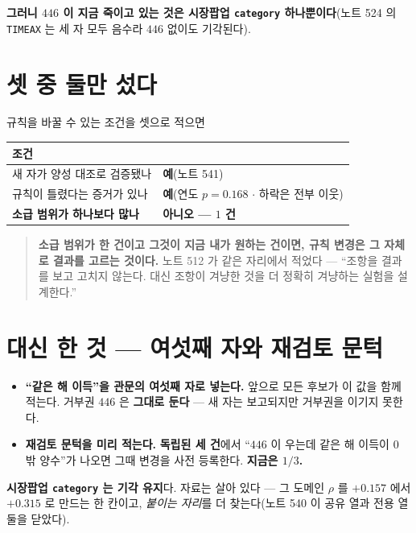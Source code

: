 \documentclass[11pt]{article}
\begin{document}
\textbf{그러니 $446$ 이 지금 죽이고 있는 것은 시장팝업 \texttt{category}
하나뿐이다}(노트 524 의 \texttt{TIMEAX} 는 세 자 모두 음수라 $446$ 없이도
기각된다).

\section{셋 중 둘만 섰다}

규칙을 바꿀 수 있는 조건을 셋으로 적으면

\begin{center}
\begin{tabular}{ll}
\hline
조건 & \\
\hline
새 자가 양성 대조로 검증됐나 & \textbf{예}(노트 541) \\
규칙이 틀렸다는 증거가 있나 & \textbf{예}(연도 $p = 0.168$ $\cdot$ 하락은 전부 이웃) \\
\textbf{소급 범위가 하나보다 많나} & \textbf{아니오 --- $1$ 건} \\
\hline
\end{tabular}
\end{center}

\begin{quote}
\textbf{소급 범위가 한 건이고 그것이 지금 내가 원하는 건이면, 규칙 변경은
그 자체로 결과를 고르는 것이다.} 노트 512 가 같은 자리에서 적었다 ---
``조항을 결과를 보고 고치지 않는다. 대신 조항이 겨냥한 것을 더 정확히
겨냥하는 실험을 설계한다.''
\end{quote}

\section{대신 한 것 --- 여섯째 자와 재검토 문턱}

\begin{itemize}
\item \textbf{``같은 해 이득''을 관문의 여섯째 자로 넣는다.} 앞으로 모든
후보가 이 값을 함께 적는다. 거부권 $446$ 은 \textbf{그대로 둔다} --- 새 자는
보고되지만 거부권을 이기지 못한다.
\item \textbf{재검토 문턱을 미리 적는다.} \textbf{독립된 세 건}에서
``$446$ 이 우는데 같은 해 이득이 $0$ 밖 양수''가 나오면 그때 변경을 사전
등록한다. \textbf{지금은 $1/3$.}
\end{itemize}

\textbf{시장팝업 \texttt{category} 는 기각 유지}다. 자료는 살아 있다 ---
그 도메인 $\rho$ 를 $+0.157$ 에서 $+0.315$ 로 만드는 한 칸이고, \emph{붙이는
자리}를 더 찾는다(노트 540 이 공유 열과 전용 열 둘을 닫았다).
\end{document}
